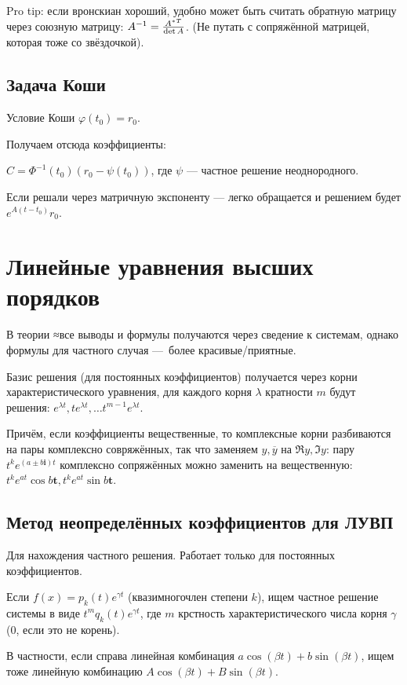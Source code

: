 \documentclass[12pt, a4paper]{article}
\begin{document}
Pro tip: если вронскиан хороший, удобно может быть считать обратную матрицу через союзную матрицу: $A^{-1} = \frac{{A^{*}}^T}{\operatorname{det} A}$.
(Не путать с сопряжённой матрицей, которая тоже со звёздочкой).

\subsection{Задача Коши}

Условие Коши $\varphi(t_0) = r_0$.

Получаем отсюда коэффициенты:

$C = \Phi^{-1}(t_0) (r_0 - \psi(t_0))$, где $\psi$ — частное решение неоднородного.

Если решали через матричную экспоненту — легко обращается и решением будет $e^{A(t - t_0)}r_0$.

\section{Линейные уравнения высших порядков}

В теории ≈все выводы и формулы получаются через сведение к системам, 
однако формулы для частного случая — более красивые/приятные.


Базис решения (для постоянных коэффициентов) получается через корни характеристического уравнения, 
для каждого корня $\lambda$ кратности $m$ будут решения: $e^{\lambda t}, te^{\lambda t}, … t^{m - 1} e^{\lambda t}$.

Причём, если коэффициенты вещественные, то комплексные корни разбиваются на пары комплексно совряжённых, 
так что заменяем $y, \overline{y}$ на $\Re y, \Im y$: пару $t^k e^{(a ± b\mathbf{i})t}$ комплексно сопряжённых можно заменить на вещественную:
$t^k e^{at} \cos b\mathbf{t}, t^k e^{at} \sin b\mathbf{t}$.


\subsection{Метод неопределённых коэффициентов для ЛУВП}

Для нахождения частного решения. Работает только для постоянных коэффициентов.

Если $f(x) = p_k(t) e^{\gamma t}$ (квазимногочлен степени $k$),
ищем частное решение системы в виде $t^m q_k(t) e^{\gamma t}$, где $m$ крстность характеристического числа корня $\gamma$ ($0$, если это не корень).

В частности, если справа линейная комбинация $a \cos(βt)+b \sin(βt)$, ищем тоже линейную комбинацию $A \cos(βt)+ B \sin(βt)$.
\end{document}
